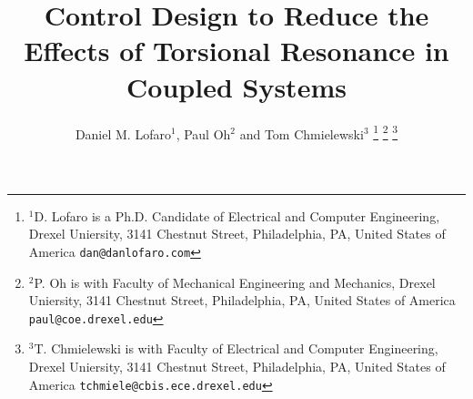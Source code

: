 \documentclass[letterpaper, 10 pt, conference]{ieeeconf}  %
\title{\LARGE \bf
Control Design to Reduce the Effects of Torsional Resonance in Coupled Systems
}
\author{Daniel M. Lofaro$^{1}$, Paul Oh$^{2}$ and Tom Chmielewski$^{3}$%
\thanks{$^{1}$D. Lofaro is a Ph.D. Candidate of Electrical and Computer Engineering,
        Drexel Uniersity, 3141 Chestnut Street, Philadelphia, PA, United States of America
        {\tt\small dan@danlofaro.com}}%
\thanks{$^{2}$P. Oh is with Faculty of Mechanical Engineering and Mechanics, Drexel Uniersity, 3141 Chestnut Street, Philadelphia, PA, United States of America
        {\tt\small paul@coe.drexel.edu}}%
\thanks{$^{3}$T. Chmielewski is with Faculty of Electrical and Computer Engineering,
        Drexel Uniersity, 3141 Chestnut Street, Philadelphia, PA, United States of America
        {\tt\small tchmiele@cbis.ece.drexel.edu}}%
}
\begin{document}
\maketitle
\thispagestyle{empty}
\pagestyle{empty}


\begin{abstract}

\end{abstract}

\IEEEpeerreviewmaketitle





%






%
{}
  




\end{document}
